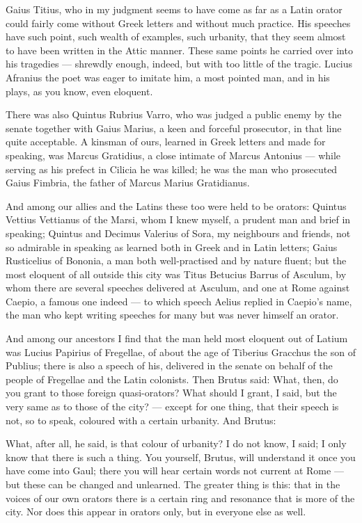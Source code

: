  Gaius Titius, who in my judgment seems to have come as far as a Latin orator could fairly come without Greek letters and without much practice. His speeches have such point, such wealth of examples, such urbanity, that they seem almost to have been written in the Attic manner. These same points he carried over into his tragedies — shrewdly enough, indeed, but with too little of the tragic. Lucius Afranius the poet was eager to imitate him, a most pointed man, and in his plays, as you know, even eloquent.

 There was also Quintus Rubrius Varro, who was judged a public enemy by the senate together with Gaius Marius, a keen and forceful prosecutor, in that line quite acceptable. A kinsman of ours, learned in Greek letters and made for speaking, was Marcus Gratidius, a close intimate of Marcus Antonius — while serving as his prefect in Cilicia he was killed; he was the man who prosecuted Gaius Fimbria, the father of Marcus Marius Gratidianus.

 And among our allies and the Latins these too were held to be orators: Quintus Vettius Vettianus of the Marsi, whom I knew myself, a prudent man and brief in speaking; Quintus and Decimus Valerius of Sora, my neighbours and friends, not so admirable in speaking as learned both in Greek and in Latin letters; Gaius Rusticelius of Bononia, a man both well-practised and by nature fluent; but the most eloquent of all outside this city was Titus Betucius Barrus of Asculum, by whom there are several speeches delivered at Asculum, and one at Rome against Caepio, a famous one indeed — to which speech Aelius replied in Caepio's name, the man who kept writing speeches for many but was never himself an orator.

 And among our ancestors I find that the man held most eloquent out of Latium was Lucius Papirius of Fregellae, of about the age of Tiberius Gracchus the son of Publius; there is also a speech of his, delivered in the senate on behalf of the people of Fregellae and the Latin colonists. Then Brutus said: What, then, do you grant to those foreign quasi-orators? What should I grant, I said, but the very same as to those of the city? — except for one thing, that their speech is not, so to speak, coloured with a certain urbanity. And Brutus:

 What, after all, he said, is that colour of urbanity? I do not know, I said; I only know that there is such a thing. You yourself, Brutus, will understand it once you have come into Gaul; there you will hear certain words not current at Rome — but these can be changed and unlearned. The greater thing is this: that in the voices of our own orators there is a certain ring and resonance that is more of the city. Nor does this appear in orators only, but in everyone else as well.

